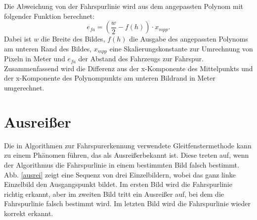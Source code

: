 \documentclass[arbeit=studie,oneside,BCOR=12mm]{ArbeitRST}
\begin{document}
Die Abweichung von der Fahrspurlinie wird aus dem angepassten Polynom mit
folgender Funktion berechnet: 
\begin{equation}
    e_{fa} = (\frac{w}{2} - f(h))\cdot x_{mpp}.
\end{equation}
Dabei ist $w$ die Breite des Bildes, $f(h)$ die Ausgabe des angepassten
Polynoms am unteren Rand des Bildes, $x_{mpp}$ eine Skalierungskonstante zur
Umrechnung von Pixeln in Meter und $e_{fa}$ der Abstand des Fahrzeugs zur
Fahrspur. Zusammenfassend wird die Differenz aus der x-Komponente des
Mittelpunkts und der x-Komponente des Polynompunkts am unteren Bildrand in
Meter umgerechnet.

\section{Ausrei{\ss}er}

Die in Algorithmen zur Fahrspurerkennung verwendete Gleitfenstermethode kann zu
einem Phänomen führen, das als \glqq Ausreißer\grqq bekannt ist. Diese treten auf, wenn
der Algorithmus die Fahrspurlinie in einem bestimmten Bild falsch bestimmt.
Abb. \ref{ausrei} zeigt eine Sequenz von drei Einzelbildern, wobei das ganz linke
Einzelbild den Ausgangspunkt bildet. Im ersten Bild wird die Fahrspurlinie
richtig erkannt, aber im zweiten Bild tritt ein Ausreißer auf, bei dem die
Fahrspurlinie falsch bestimmt wird. Im letzten Bild wird die Fahrspurlinie
wieder korrekt erkannt.
\end{document}
